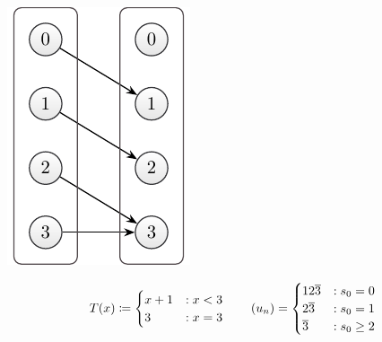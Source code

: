 \documentclass{stdlocal}
\begin{document}
  \medskip
  \begin{minipage}{0.2\textwidth}
    \includegraphics[width=\textwidth]{figures/periodicity_example_b.pdf}
  \end{minipage}
  \hfill
  \begin{minipage}{0.73\textwidth}
    \[
      T(x) \coloneqq
      \begin{cases}
        x + 1 &: x < 3 \\
        3 &: x = 3
      \end{cases}
    \qquad
      (u_n) =
      \begin{cases}
        12\overline{3} &: s_0 = 0 \\
        2\overline{3} &: s_0 = 1 \\
        \overline{3} &: s_0 \geq 2 \\
      \end{cases}
    \]
  \end{minipage}
  \medskip
\end{document}
